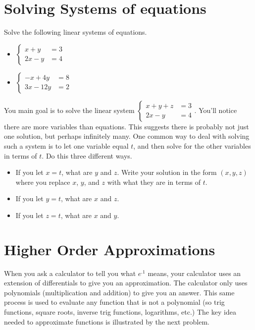 \section{Solving Systems of equations}


\begin{problem}
Solve the following linear systems of equations.
\begin{itemize}
\item $\begin{cases}x+y&=3\\2x-y&=4\end{cases}$
\item $\begin{cases}-x + 4y&=8\\3x - 12y&=2\end{cases}$
\end{itemize}
\end{problem}

\begin{problem}
You main goal is to solve the linear system 
$\begin{cases}x+y+z&=3\\2x-y&=4\end{cases}$.  
You'll notice there are more variables than equations. This suggests there is probably not just one solution, but perhaps infinitely many.  One common way to deal with solving such a system is to let one variable equal $t$, and then solve for the other variables in terms of $t$. Do this three different ways.
\begin{itemize}
\item If you let $x=t$, what are $y$ and $z$.  Write your solution in the form $(x,y,z)$ where you replace $x$, $y$, and $z$ with what they are in terms of $t$.
\item If you let $y=t$, what are $x$ and $z$.
\item If you let $z=t$, what are $x$ and $y$.
\end{itemize}
\end{problem}


\section{Higher Order Approximations} 
When you ask a calculator to tell you what $e^{.1}$ means, your calculator uses an extension of differentials to give you an approximation.  The calculator only uses polynomials (multiplication and addition) to give you an answer.  This same process is used to evaluate any function that is not a polynomial (so trig functions, square roots, inverse trig functions, logarithms, etc.) 
The key idea needed to approximate functions is illustrated by the next problem.

